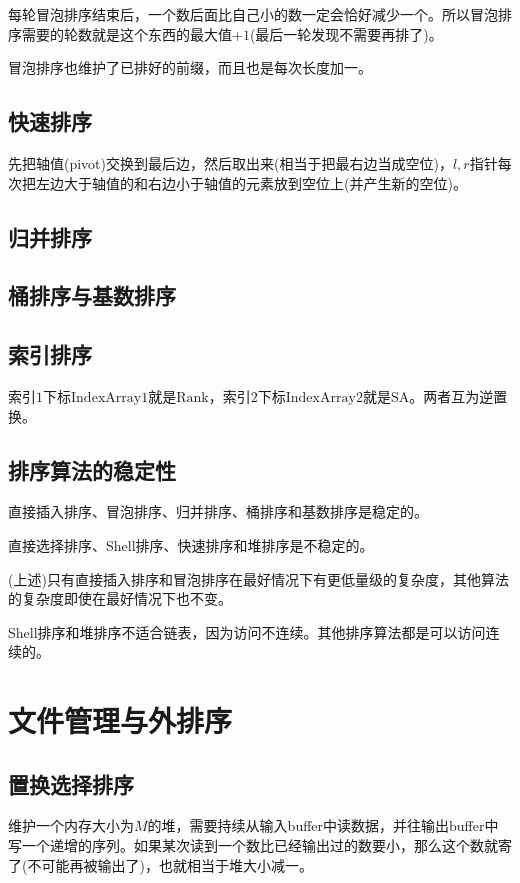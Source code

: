 \documentclass[8pt]{article}
\begin{document}
每轮冒泡排序结束后，一个数后面比自己小的数一定会恰好减少一个。所以冒泡排序需要的轮数就是这个东西的最大值$+1$(最后一轮发现不需要再排了)。

冒泡排序也维护了已排好的前缀，而且也是每次长度加一。

\subsection{快速排序}

先把轴值(pivot)交换到最后边，然后取出来(相当于把最右边当成空位)，$l, r$指针每次把左边大于轴值的和右边小于轴值的元素放到空位上(并产生新的空位)。

\subsection{归并排序}

\subsection{桶排序与基数排序}
\subsection{索引排序}
索引$1$下标$\mathrm{IndexArray1}$就是$\mathrm{Rank}$，索引$2$下标$\mathrm{IndexArray2}$就是$\mathrm{SA}$。两者互为逆置换。

\subsection{排序算法的稳定性}
直接插入排序、冒泡排序、归并排序、桶排序和基数排序是稳定的。

直接选择排序、Shell排序、快速排序和堆排序是不稳定的。

(上述)只有直接插入排序和冒泡排序在最好情况下有更低量级的复杂度，其他算法的复杂度即使在最好情况下也不变。

Shell排序和堆排序不适合链表，因为访问不连续。其他排序算法都是可以访问连续的。

\section{文件管理与外排序}
\subsection{置换选择排序}
维护一个内存大小为$M$的堆，需要持续从输入buffer中读数据，并往输出buffer中写一个递增的序列。如果某次读到一个数比已经输出过的数要小，那么这个数就寄了(不可能再被输出了)，也就相当于堆大小减一。
\end{document}
